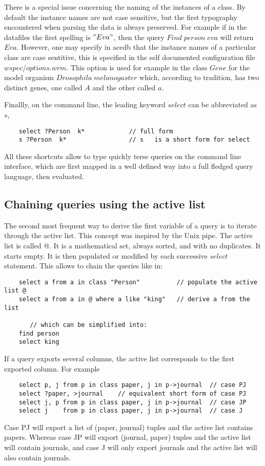 \documentclass[11pt]{article}
\newcommand{\BL}{\begin{lstlisting}}
\begin{document}
There is a special issue concerning the naming of the instances of a class. By default
the instance names are not case sensitive, but the first typography encountered when parsing
the data is always preserved. For example if in the datafiles the first spelling is $"Eva"$, then
the query $Find\; person\; eva$ will return $Eva$. However, one may specify in acedb that the
instance names of a particular class are case sentitive, this is specified in the
self documented configuration file $wspec/options.wrm$. This option is used for example
in the class $Gene$ for the model organism $Drosophila\;melanogaster$ which, according
to tradition, has two distinct genes, one called $A$ and the other called $a$.


Finallly, on the command line, the leading keyword $select$ can be abbreviated as $s$,
\BL
    select ?Person  k*            // full form
    s ?Person  k*                 // s   is a short form for select
\end{lstlisting}

All these shortcuts allow to type quickly terse queries on the command line interface, 
which are first mapped in a well defined way into a full fledged query language,
then evaluated.


\subsection{Chaining queries using the active list}
The second most frequent way to derive the first variable of a query is to iterate 
through the active list. This concept was inspired by the Unix pipe. 
The active list is called @. It is a mathematical set, always sorted,
and with no duplicates. It starts empty. It is then populated 
or modified by each successive $select$ statement. This allows to chain the queries like in:
\BL
    select a from a in class "Person"          // populate the active list @
    select a from a in @ where a like "king"   // derive a from the list

       // which can be simplified into:
    find person
    select king
\end{lstlisting}

If a query exports several columns, the active list corresponds to the first exported column. For example
\BL
    select p, j from p in class paper, j in p->journal  // case PJ
    select ?paper, >journal    // equivalent short form of case PJ
    select j, p from p in class paper, j in p->journal  // case JP
    select j    from p in class paper, j in p->journal  // case J
\end{lstlisting}
Case PJ will export a list of (paper, journal) tuples and the active list contains 
papers. Whereas case JP will export (journal, paper) tuples and the active list 
will contain journals, and case J will only export journals  and the active list will also contain journals.
\end{document}
